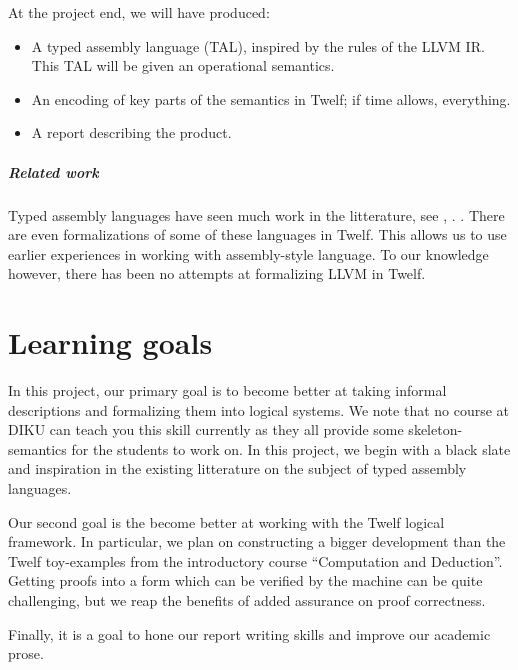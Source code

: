 \documentclass[a4paper, oneside, 10pt, draft]{memoir}
\begin{document}
At the project end, we will have produced:
\begin{itemize}
\item A typed assembly language (TAL), inspired by the rules of the LLVM
  IR. This TAL will be given an operational semantics.
\item An encoding of key parts of the semantics in Twelf; if time
  allows, everything.
\item A report describing the product.
\end{itemize}

\paragraph{Related work}

Typed assembly languages have seen much work in the litterature, see
\cite{crary:..}, \cite{morisett:...}. . There are even formalizations of some of these languages in
Twelf. This allows us to use earlier experiences in working with
assembly-style language. To our knowledge
however, there has been no attempts at formalizing LLVM in Twelf.

\chapter*{Learning goals}

In this project, our primary goal is to become better at taking
informal descriptions and formalizing them into logical systems. We
note that no course at DIKU can teach you this skill currently as they
all provide some skeleton-semantics for the students to work on. In
this project, we begin with a black slate and inspiration in the
existing litterature on the subject of typed assembly languages.

Our second goal is the become better at working with the Twelf logical
framework. In particular, we plan on constructing a bigger development
than the Twelf toy-examples from the introductory course ``Computation
and Deduction''. Getting proofs into a form which can be verified by
the machine can be quite challenging, but we reap the benefits of
added assurance on proof correctness.

Finally, it is a goal to hone our report writing skills and improve
our academic prose.


\end{document}
